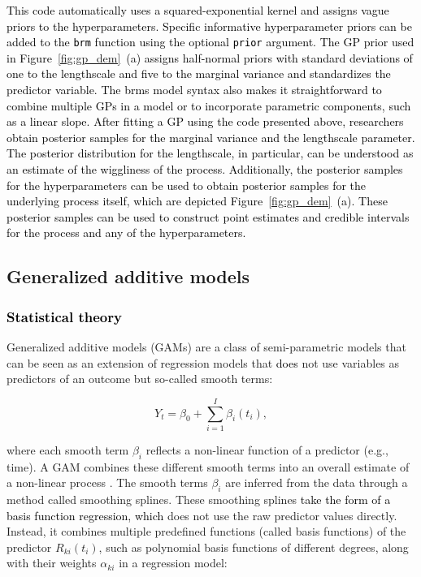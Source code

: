 \documentclass[man, floatsintext]{apa7}
\begin{document}
\noindent\textcolor{black}{This code
  automatically uses a squared-exponential kernel and assigns vague priors to
  the hyperparameters. Specific informative hyperparameter priors can be added
  to the {\fontsize{10}{12}\selectfont\texttt{brm}} function using the optional
    {\fontsize{10}{12}\selectfont\texttt{prior}} argument. The GP prior used in
  Figure~\ref{fig:gp_dem}~(a) assigns half-normal priors with standard
  deviations of one to the lengthscale and five to the marginal variance and
  standardizes the predictor variable. The brms model syntax also
  makes it straightforward to combine multiple GPs in a model or to incorporate
  parametric components, such as a linear slope. After fitting a GP using the
  code presented above, researchers obtain posterior samples for the marginal
  variance and the lengthscale parameter. The posterior distribution for the
  lengthscale, in particular, can be understood as an estimate of the
  wiggliness of the process. Additionally, the posterior samples for the
  hyperparameters can be used to obtain posterior samples for the
  underlying process itself, which are depicted Figure~\ref{fig:gp_dem}~(a).
  These posterior samples can be used to construct
  point estimates and credible intervals for the process and any of the
  hyperparameters.
}

\subsection{Generalized additive models}

\subsubsection{\textcolor{black}{Statistical theory}}

Generalized additive models (GAMs) are a class of semi-parametric models that
can be seen as an extension of regression models that \textcolor{black}{does}
not use variables as predictors of an outcome but so-called smooth terms:

\begin{equation}
  Y_t = \beta_0 + \sum_{i = 1}^{I} \beta_i(t_i),
\end{equation}

\noindent where each smooth term $\beta_i$ reflects a non-linear function of a
predictor (e.g., time). A GAM combines these different smooth terms into an
overall estimate of a non-linear process \parencite{wood_generalized_2006,
  wood_inference_2020, hastie_generalized_1999}. The smooth terms $\beta_i$ are
inferred from the data through a method called smoothing splines. These
smoothing splines \textcolor{black}{take the form of a basis function
  regression, which
} does not use the raw predictor values directly. Instead, it
combines multiple predefined functions (called basis functions) of the
predictor $R_{ki}(t_i)$, such as polynomial basis functions of different
degrees, along with their weights $\alpha_{ki}$ in a regression model:
\end{document}
